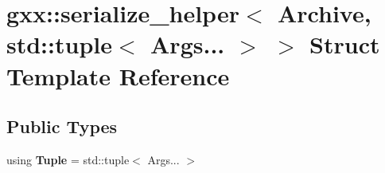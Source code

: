 \hypertarget{structgxx_1_1serialize__helper_3_01Archive_00_01std_1_1tuple_3_01Args_8_8_8_01_4_01_4}{}\section{gxx\+:\+:serialize\+\_\+helper$<$ Archive, std\+:\+:tuple$<$ Args... $>$ $>$ Struct Template Reference}
\label{structgxx_1_1serialize__helper_3_01Archive_00_01std_1_1tuple_3_01Args_8_8_8_01_4_01_4}
\subsection*{Public Types}
\begin{DoxyCompactItemize}
\item 
using {\bfseries Tuple} = std\+::tuple$<$ Args... $>$\hypertarget{structgxx_1_1serialize__helper_3_01Archive_00_01std_1_1tuple_3_01Args_8_8_8_01_4_01_4_a3cdc532a27816a9ce04a001b74e90aff}{}\label{structgxx_1_1serialize__helper_3_01Archive_00_01std_1_1tuple_3_01Args_8_8_8_01_4_01_4_a3cdc532a27816a9ce04a001b74e90aff}

\end{DoxyCompactItemize}
